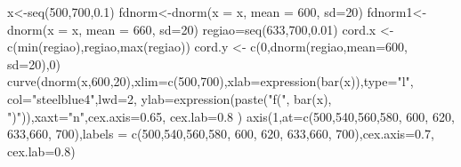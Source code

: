 \documentclass[
  letterpaper,
  DIV=11,
  numbers=noendperiod]{scrartcl}
\newenvironment{Shaded}{\begin{snugshade}}{\end{snugshade}}
\newcommand{\AttributeTok}[1]{\textcolor[rgb]{0.40,0.45,0.13}{#1}}
\newcommand{\DecValTok}[1]{\textcolor[rgb]{0.68,0.00,0.00}{#1}}
\newcommand{\FloatTok}[1]{\textcolor[rgb]{0.68,0.00,0.00}{#1}}
\newcommand{\FunctionTok}[1]{\textcolor[rgb]{0.28,0.35,0.67}{#1}}
\newcommand{\NormalTok}[1]{\textcolor[rgb]{0.00,0.23,0.31}{#1}}
\newcommand{\OtherTok}[1]{\textcolor[rgb]{0.00,0.23,0.31}{#1}}
\newcommand{\StringTok}[1]{\textcolor[rgb]{0.13,0.47,0.30}{#1}}
\begin{document}
\begin{Shaded}
\begin{Highlighting}[]
\NormalTok{x}\OtherTok{\textless{}{-}}\FunctionTok{seq}\NormalTok{(}\DecValTok{500}\NormalTok{,}\DecValTok{700}\NormalTok{,}\FloatTok{0.1}\NormalTok{) }
\NormalTok{fdnorm}\OtherTok{\textless{}{-}}\FunctionTok{dnorm}\NormalTok{(}\AttributeTok{x =}\NormalTok{ x, }\AttributeTok{mean =} \DecValTok{600}\NormalTok{, }\AttributeTok{sd=}\DecValTok{20}\NormalTok{)  }
\NormalTok{fdnorm1}\OtherTok{\textless{}{-}}\FunctionTok{dnorm}\NormalTok{(}\AttributeTok{x =}\NormalTok{ x, }\AttributeTok{mean =} \DecValTok{660}\NormalTok{, }\AttributeTok{sd=}\DecValTok{20}\NormalTok{)}
\NormalTok{regiao}\OtherTok{=}\FunctionTok{seq}\NormalTok{(}\DecValTok{633}\NormalTok{,}\DecValTok{700}\NormalTok{,}\FloatTok{0.01}\NormalTok{)}
\NormalTok{cord.x }\OtherTok{\textless{}{-}} \FunctionTok{c}\NormalTok{(}\FunctionTok{min}\NormalTok{(regiao),regiao,}\FunctionTok{max}\NormalTok{(regiao))}
\NormalTok{cord.y }\OtherTok{\textless{}{-}} \FunctionTok{c}\NormalTok{(}\DecValTok{0}\NormalTok{,}\FunctionTok{dnorm}\NormalTok{(regiao,}\AttributeTok{mean=}\DecValTok{600}\NormalTok{, }\AttributeTok{sd=}\DecValTok{20}\NormalTok{),}\DecValTok{0}\NormalTok{) }
\FunctionTok{curve}\NormalTok{(}\FunctionTok{dnorm}\NormalTok{(x,}\DecValTok{600}\NormalTok{,}\DecValTok{20}\NormalTok{),}\AttributeTok{xlim=}\FunctionTok{c}\NormalTok{(}\DecValTok{500}\NormalTok{,}\DecValTok{700}\NormalTok{),}\AttributeTok{xlab=}\FunctionTok{expression}\NormalTok{(}\FunctionTok{bar}\NormalTok{(x)),}\AttributeTok{type=}\StringTok{"l"}\NormalTok{,}
      \AttributeTok{col=}\StringTok{"steelblue4"}\NormalTok{,}\AttributeTok{lwd=}\DecValTok{2}\NormalTok{, }\AttributeTok{ylab=}\FunctionTok{expression}\NormalTok{(}\FunctionTok{paste}\NormalTok{(}\StringTok{"f("}\NormalTok{, }\FunctionTok{bar}\NormalTok{(x),}
      \StringTok{")"}\NormalTok{)),}\AttributeTok{xaxt=}\StringTok{"n"}\NormalTok{,}\AttributeTok{cex.axis=}\FloatTok{0.65}\NormalTok{, }\AttributeTok{cex.lab=}\FloatTok{0.8}\NormalTok{ ) }
\FunctionTok{axis}\NormalTok{(}\DecValTok{1}\NormalTok{,}\AttributeTok{at=}\FunctionTok{c}\NormalTok{(}\DecValTok{500}\NormalTok{,}\DecValTok{540}\NormalTok{,}\DecValTok{560}\NormalTok{,}\DecValTok{580}\NormalTok{, }\DecValTok{600}\NormalTok{, }\DecValTok{620}\NormalTok{, }\DecValTok{633}\NormalTok{,}\DecValTok{660}\NormalTok{, }\DecValTok{700}\NormalTok{),}\AttributeTok{labels =}
       \FunctionTok{c}\NormalTok{(}\DecValTok{500}\NormalTok{,}\DecValTok{540}\NormalTok{,}\DecValTok{560}\NormalTok{,}\DecValTok{580}\NormalTok{, }\DecValTok{600}\NormalTok{, }\DecValTok{620}\NormalTok{, }\DecValTok{633}\NormalTok{,}\DecValTok{660}\NormalTok{, }\DecValTok{700}\NormalTok{),}\AttributeTok{cex.axis=}\FloatTok{0.7}\NormalTok{, }\AttributeTok{cex.lab=}\FloatTok{0.8}\NormalTok{) }

\end{Highlighting}
\end{Shaded}
\end{document}
